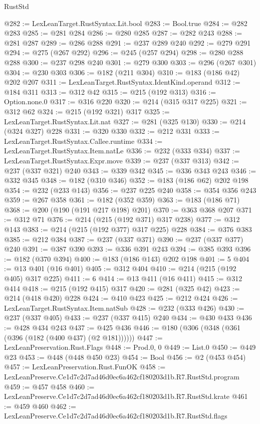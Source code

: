 \begin{lexlean}{RustStd}
\begin{coremodule}
@282 := LexLeanTarget.RustSyntax.Lit.bool
@283 := Bool.true
@284 := @282 @283
@285 := @281 @284
@286 := @280 @285
@287 := @282 @243
@288 := @281 @287
@289 := @286 @288
@291 := @237 @289 @240
@292 := @279 @291
@294 := @275 (@267 @292)
@296 := @245 (@257 @294)
@298 := @280 @288 @288
@300 := @237 @298 @240
@301 := @279 @300
@303 := @296 (@267 @301)
@304 := @230 @303
@306 := @182 (@211 @304)
@310 := @183 (@186 @42) @202 @207
@311 := LexLeanTarget.RustSyntax.IdentKind.operand
@312 := @184 @311
@313 := @312 @42
@315 := @215 (@192 @313)
@316 := Option.none.{0}
@317 := @316 @220
@320 := @214 (@315 @317 @225)
@321 := @312 @62
@324 := @215 (@192 @321) @317
@325 := LexLeanTarget.RustSyntax.Lit.nat
@327 := @281 (@325 @130)
@330 := @214 (@324 @327) @228
@331 := @320 @330
@332 := @212 @331
@333 := LexLeanTarget.RustSyntax.Callee.runtime
@334 := LexLeanTarget.RustSyntax.Item.natLe
@336 := @232 (@333 @334)
@337 := LexLeanTarget.RustSyntax.Expr.move
@339 := @237 (@337 @313)
@342 := @237 (@337 @321) @240
@343 := @339 @342
@345 := @336 @343 @243
@346 := @332 @345
@348 := @182 (@310 @346)
@352 := @183 (@186 @62) @202 @198
@354 := @232 (@233 @143)
@356 := @237 @225 @240
@358 := @354 @356 @243
@359 := @267 @358
@361 := @182 (@352 @359)
@363 := @183 (@186 @71)
@368 := @200 (@190 (@191 @217 @198) @201)
@370 := @363 @368 @207
@371 := @312 @71
@376 := @214 (@215 (@192 @371) @317 @238)
@377 := @312 @143
@383 := @214 (@215 (@192 @377) @317 @225) @228
@384 := @376 @383
@385 := @212 @384
@387 := @237 (@337 @371)
@390 := @237 (@337 @377) @240
@391 := @387 @390
@393 := @336 @391 @243
@394 := @385 @393
@396 := @182 (@370 @394)
@400 := @183 (@186 @143) @202 @198
@401 := 5
@404 := @13 @401 (@16 @401)
@405 := @312 @404
@410 := @214 (@215 (@192 @405) @317 @225)
@411 := 6
@414 := @13 @411 (@16 @411)
@415 := @312 @414
@418 := @215 (@192 @415) @317
@420 := @281 (@325 @42)
@423 := @214 (@418 @420) @228
@424 := @410 @423
@425 := @212 @424
@426 := LexLeanTarget.RustSyntax.Item.natSub
@428 := @232 (@333 @426)
@430 := @237 (@337 @405)
@433 := @237 (@337 @415) @240
@434 := @430 @433
@436 := @428 @434 @243
@437 := @425 @436
@446 := @180 (@306 (@348 (@361 (@396 (@182 (@400 @437) (@2 @181))))))
@447 := LexLeanPreservation.Rust.Flags
@448 := Prod.{0, 0}
@449 := List.{0}
@450 := @449 @23
@453 := @448 (@448 @450 @23)
@454 := Bool
@456 := @2 (@453 @454)
@457 := LexLeanPreservation.Rust.FunOK
@458 := LexLeanPreserve.Ce1d7c2d7ad46d0ec6a462cf180203d1b.R7.RustStd.program
@459 := @457 @458
@460 := LexLeanPreserve.Ce1d7c2d7ad46d0ec6a462cf180203d1b.R7.RustStd.krate
@461 := @459 @460
@462 := LexLeanPreserve.Ce1d7c2d7ad46d0ec6a462cf180203d1b.R7.RustStd.flags

\end{coremodule}
\end{lexlean}
